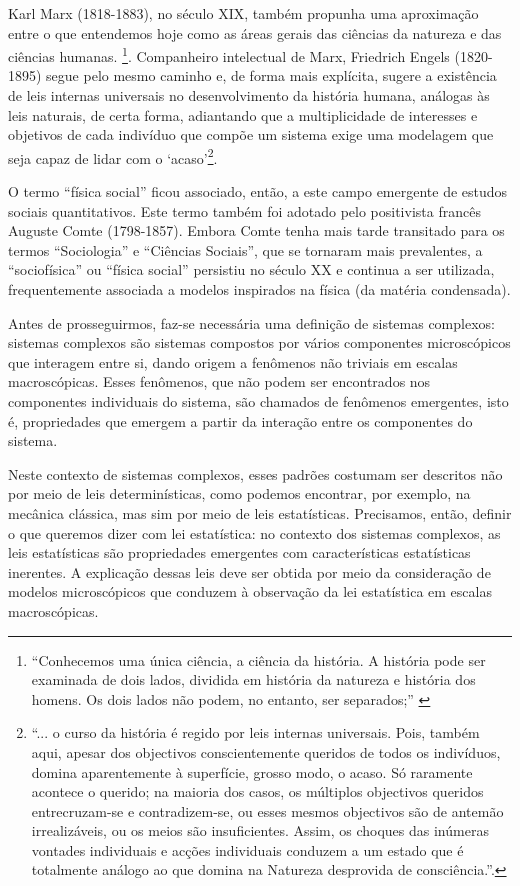Karl Marx (1818-1883), no século XIX, também propunha uma aproximação entre o que entendemos hoje como as áreas gerais das ciências da natureza e das ciências humanas. \footnote{``Conhecemos uma única ciência, a ciência da história. A história pode ser examinada de dois lados, dividida em história da natureza e história dos homens. Os dois lados não podem, no entanto, ser separados;'' \cite{marx2021ideologia}}. Companheiro intelectual de Marx,  Friedrich Engels (1820-1895) segue pelo mesmo caminho e, de forma mais explícita, sugere a existência de leis internas universais no desenvolvimento da história humana, análogas às leis naturais, de certa forma, adiantando que a multiplicidade de interesses e objetivos de cada indivíduo que compõe um sistema exige uma modelagem que seja capaz de lidar com o `acaso'\footnote{``... o curso da história é regido por leis internas universais. Pois, também aqui, apesar dos objectivos conscientemente queridos de todos os indivíduos, domina aparentemente à superfície, grosso modo, o acaso. Só raramente acontece o querido; na maioria dos casos, os múltiplos objectivos queridos entrecruzam-se e contradizem-se, ou esses mesmos objectivos são de antemão irrealizáveis, ou os meios são insuficientes. Assim, os choques das inúmeras vontades individuais e acções individuais conduzem a um estado que é totalmente análogo ao que domina na Natureza desprovida de consciência.''\cite{engels2024ludwig}.}.

O termo ``física social'' ficou associado, então, a este campo emergente de estudos sociais quantitativos. Este termo também foi adotado pelo positivista francês Auguste Comte (1798-1857). Embora Comte tenha mais tarde transitado para os termos ``Sociologia'' e ``Ciências Sociais'', que se tornaram mais prevalentes, a ``sociofísica'' ou ``física social'' persistiu no século XX e continua a ser utilizada, frequentemente associada a modelos inspirados na física (da matéria condensada). 

Antes de prosseguirmos, faz-se necessária uma definição de sistemas complexos: sistemas complexos são sistemas compostos por vários componentes microscópicos que interagem entre si, dando origem a fenômenos não triviais em escalas macroscópicas. Esses fenômenos, que não podem ser encontrados nos componentes individuais do sistema, são chamados de fenômenos emergentes, isto é, propriedades que emergem a partir da interação entre os componentes do sistema.

Neste contexto de sistemas complexos, esses padrões costumam ser descritos não por meio de leis determinísticas, como podemos encontrar, por exemplo, na mecânica clássica, mas sim por meio de leis estatísticas.  Precisamos, então, definir o que queremos dizer com lei estatística: no contexto dos sistemas complexos, as leis estatísticas são propriedades emergentes com características estatísticas inerentes. A explicação dessas leis deve ser obtida por meio da consideração de modelos microscópicos que conduzem à observação da lei estatística em escalas macroscópicas.

